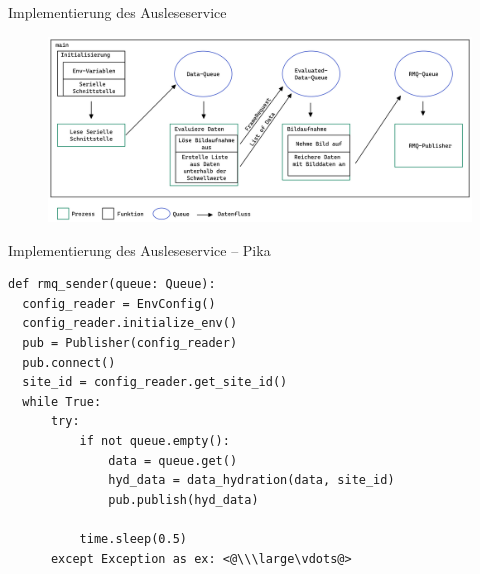 \documentclass[10pt,ngerman]{beamer}
\begin{document}
\begin{frame}[fragile]{Implementierung des Ausleseservice}
  \begin{figure}[htpb]
    \centering
    \includegraphics[width=1\textwidth]{pics/DataReaderDataFlow.png}
  \end{figure}
\end{frame}


\begin{frame}[fragile]{Implementierung des Ausleseservice -- Pika}
  \begin{lstlisting}[style=MyPythonStyle,
    breaklines=true, firstnumber=75]
def rmq_sender(queue: Queue):
  config_reader = EnvConfig()
  config_reader.initialize_env()
  pub = Publisher(config_reader)
  pub.connect()
  site_id = config_reader.get_site_id()
  while True:
      try:
          if not queue.empty():
              data = queue.get()
              hyd_data = data_hydration(data, site_id)
              pub.publish(hyd_data)

          time.sleep(0.5)
      except Exception as ex: <@\\\large\vdots@>
\end{lstlisting}
\end{frame}
\end{document}
